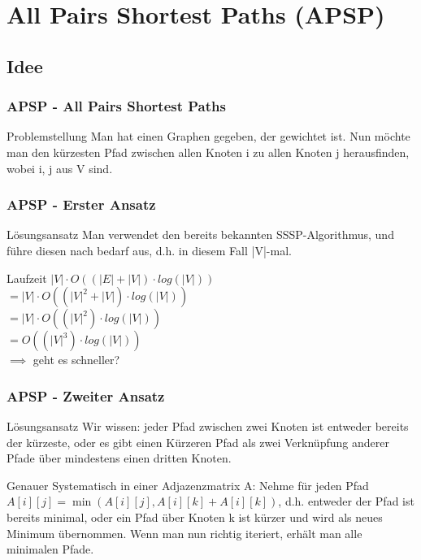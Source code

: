 \section{All Pairs Shortest Paths (APSP)} 

\subsection{Idee} 

\begin{frame}
\frametitle{APSP - All Pairs Shortest Paths}
\begin{block}{Problemstellung}
Man hat einen Graphen gegeben, der gewichtet ist. Nun möchte man den kürzesten Pfad zwischen allen Knoten i zu allen Knoten j herausfinden, wobei i, j aus V sind.
\end{block}
\end{frame}


\begin{frame}
\frametitle{APSP - Erster Ansatz}
\begin{block}{Lösungsansatz}
Man verwendet den bereits bekannten SSSP-Algorithmus, und führe diesen nach bedarf aus, d.h. in diesem Fall |V|-mal.
\end{block}

\begin{block}{Laufzeit}
$|V| \cdot O ((|E| + |V|) \cdot log(|V|))$\\$
= |V| \cdot O ((|V|^2 + |V|) \cdot log(|V|))$\\$
= |V| \cdot O ((|V|^2) \cdot log(|V|)) $\\$
= O ((|V|^3) \cdot log(|V|))$\\
$\implies$ geht es schneller?
\end{block}
\end{frame}


\begin{frame}
\frametitle{APSP - Zweiter Ansatz}
\begin{block}{Lösungsansatz}
Wir wissen: jeder Pfad zwischen zwei Knoten ist entweder bereits der kürzeste, oder es gibt einen Kürzeren Pfad als zwei Verknüpfung anderer Pfade über mindestens einen dritten Knoten.
\end{block}

\begin{block}{Genauer}
Systematisch in einer Adjazenzmatrix A:
Nehme für jeden Pfad $A[i][j] = \min\left(A[i][j], A[i][k] + A[i][k]\right)$, d.h. entweder der Pfad ist bereits minimal, oder ein Pfad über Knoten k ist kürzer und wird als neues Minimum übernommen.
Wenn man nun richtig iteriert, erhält man alle minimalen Pfade.
\end{block}
\end{frame}

